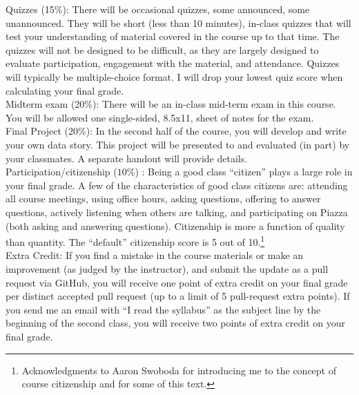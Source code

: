 \documentclass[10pt]{article}
\begin{document}
\noindent Quizzes (15\%): There will be occasional quizzes, some announced, some unannounced. They will be short (less than 10 minutes), in-class quizzes that will test your understanding of material covered in the course up to that time. The quizzes will not be designed to be difficult, as they are largely designed to evaluate participation, engagement with the material, and attendance. Quizzes will typically be multiple-choice format. I will drop your lowest quiz score when calculating your final grade.  \\

\noindent Midterm exam (20\%): There will be an in-class mid-term exam in this course. You will be allowed one single-sided, 8.5x11, sheet of notes for the exam.\\

\noindent Final Project (20\%): In the second half of the course, you will develop and write your own data story. This project will be presented to and evaluated (in part) by your classmates. A separate handout will provide details. \\

\noindent Participation/citizenship ($10\%$) : Being a good class ``citizen'' plays a large role in your final grade. A few of the characteristics of good class citizens are: attending all course meetings, using office hours, asking questions, offering to answer questions, actively listening when others are talking, and participating on Piazza (both asking and answering questions). Citizenship is more a function of quality than quantity. The ``default'' citizenship score is 5 out of 10.\footnote{Acknowledgments to Aaron Swoboda for introducing me to the concept of course citizenship and for some of this text.} \\


\noindent Extra Credit: If you find a mistake in the course materials or make an improvement (as judged by the instructor), and submit the update as a pull request via GitHub, you will receive one point of extra credit on your final grade per distinct accepted pull request (up to a limit of 5 pull-request extra points). If you send me an email with ``I read the syllabus'' as the subject line by the beginning of the second class, you will receive two points of extra credit on your final grade. 
\end{document}
